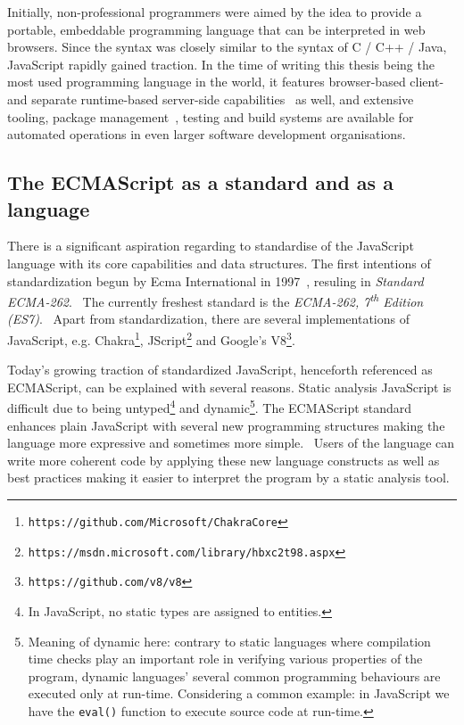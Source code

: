 Initially, non-professional programmers were aimed by the idea to provide a portable, embeddable programming language that can be interpreted in web browsers. Since the syntax was closely similar to the syntax of C / C++ / Java, JavaScript rapidly gained traction. In the time of writing this thesis being the most used programming language in the world, it features browser-based client- and separate runtime-based server-side capabilities~\cite{nodejs} as well, and extensive tooling, package management~\cite{npmjs}, testing and build systems are available for automated operations in even larger software development organisations.


\subsection{The ECMAScript as a standard and as a language}

There is a significant aspiration regarding to standardise of the JavaScript language with its core capabilities and data structures. The first intentions of standardization begun by Ecma International in 1997~\cite{webedjavascripthistory}, resuling in \emph{Standard ECMA-262}.~\cite{ecmascriptstandardfirstversion} The currently freshest standard is the \emph{ECMA-262, 7\textsuperscript{th} Edition (ES7)}.~\cite{ecmascriptstandard} Apart from standardization, there are several implementations of JavaScript, e.g. Chakra\footnote{\texttt{https://github.com/Microsoft/ChakraCore}}, JScript\footnote{\texttt{https://msdn.microsoft.com/library/hbxc2t98.aspx}} and Google's V8\footnote{\texttt{https://github.com/v8/v8}}.~\cite{stein-daniel-msc}

Today's growing traction of standardized JavaScript, henceforth referenced as ECMAScript, can be explained with several reasons. Static analysis JavaScript is difficult due to being untyped\footnote{In JavaScript, no static types are assigned to entities.} and dynamic\footnote{Meaning of dynamic here: contrary to static languages where compilation time checks play an important role in verifying various properties of the program, dynamic languages' several common programming behaviours are executed only at run-time. Considering a common example: in JavaScript we have the \texttt{eval()} function to execute source code at run-time.}. The ECMAScript standard enhances plain JavaScript with several new programming structures making the language more expressive and sometimes more simple.~\cite{es6-features} Users of the language can write more coherent code by applying these new language constructs as well as best practices making it easier to interpret the program by a static analysis tool.



